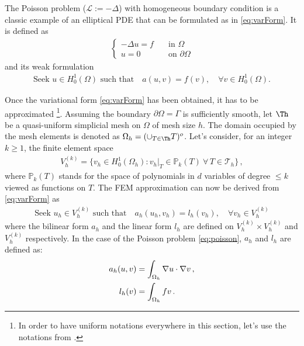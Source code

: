 The Poisson problem ($\mathcal{L} := -\Delta$) with homogeneous boundary condition is a classic example of an elliptical PDE that can be formulated as in \eqref{eq:varForm}. It is defined as 
\begin{align}
    \begin{cases}
        -\Delta u = f  &\quad \text{in } \Omega \\
        u = 0  &\quad \text{on } \partial\Omega
    \end{cases}
    \label{eq:poisson}
\end{align}
and its weak formulation
\begin{align}
    \text{Seek } u \in H^1_0(\Omega) \text{ such that} \quad a(u,v)=f(v), \quad \forall v \in H^1_0(\Omega).
    \label{eq:varFormPoisson}
\end{align}

Once the variational form \eqref{eq:varForm} has been obtained, it has to be approximated \footnote{In order to have uniform notations everywhere in this section, let's use the notations from \parencite{Reference3}.}. Assuming the boundary $\partial \Omega = \Gamma$ is sufficiently smooth, let $\Th$ be a quasi-uniform simplicial mesh on $\Omega$ of mesh size $h$. The domain occupied by the mesh elements is denoted as $\Omega_h = (\cup_{T \in \Th}T)^o$. Let's consider, for an integer $k \ge 1$, the finite element space
\begin{eqnarray*}
 V_{h}^{(k)} = \{v_h \in H^1_0 (\Omega_h) : v_h |_T \in \mathbb{P}_k (T)
 \  \forall \, T \in \mathcal{T}_h \} \,,
\end{eqnarray*}
where $\mathbb{P}_k (T)$ stands for the space of polynomials in $d$ variables of degree $\le k$ viewed as functions on $T$. 
The FEM approximation can now be derived from \eqref{eq:varForm} as
\begin{align}
    \text{Seek } u_h \in V_{h}^{(k)} \text{ such that} \quad a_h(u_h,v_h)=l_h(v_h), \quad \forall v_h \in V_{h}^{(k)}
    \label{eq:varFormFEM}
\end{align}
where the bilinear form $a_h$ and the linear form $l_h$ are defined on $V_h^{(k)} \times V_h^{(k)}$ and $V_h^{(k)}$ respectively.
In the case of the Poisson problem \eqref{eq:poisson}, $a_h$ and $l_h$ are defined as: 
\begin{align}
    \notag
    a_h(u,v) &=\int_{\Omega_h} \nabla u \cdot \nabla v \,,\\
    l_h(v) &= \int_{\Omega_h} fv \,.
    \label{eq:PoissonClassic}
\end{align}

